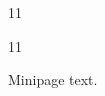 \documentclass[paper=A4]{ropas-poster}
\begin{document}
\begin{postergrid}{1}{1}
\begin{posterblock}{1}{1}
\begin{minipage}{80bp}Minipage text.\end{minipage}
\end{posterblock}
\end{postergrid}
\end{document}

